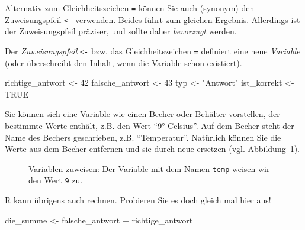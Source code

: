 \documentclass[
  letterpaper,
  twoside,
  open=any]{scrbook}
\newenvironment{Shaded}{\begin{snugshade}}{\end{snugshade}}
\newcommand{\ConstantTok}[1]{\textcolor[rgb]{0.56,0.35,0.01}{#1}}
\newcommand{\DecValTok}[1]{\textcolor[rgb]{0.68,0.00,0.00}{#1}}
\newcommand{\NormalTok}[1]{\textcolor[rgb]{0.00,0.23,0.31}{#1}}
\newcommand{\OtherTok}[1]{\textcolor[rgb]{0.00,0.23,0.31}{#1}}
\newcommand{\SpecialCharTok}[1]{\textcolor[rgb]{0.37,0.37,0.37}{#1}}
\newcommand{\StringTok}[1]{\textcolor[rgb]{0.13,0.47,0.30}{#1}}
\theoremstyle{definition}
\theoremstyle{definition}
\theoremstyle{definition}
\theoremstyle{remark}
\begin{document}
Alternativ zum Gleichheitszeichen \texttt{=} können Sie auch (synonym)
den Zuweisungspfeil \texttt{\textless{}-} verwenden. Beides führt zum
gleichen Ergebnis. Allerdings ist der Zuweisungspfeil präziser, und
sollte daher \emph{bevorzugt} werden.

Der \emph{Zuweisungspfeil} \texttt{\textless{}-} bzw. das
Gleichheitszeichen \texttt{=} definiert eine neue \emph{Variable} (oder
überschreibt den Inhalt, wenn die Variable schon existiert).

\begin{Shaded}
\begin{Highlighting}[]
\NormalTok{richtige\_antwort }\OtherTok{\textless{}{-}} \DecValTok{42}
\NormalTok{falsche\_antwort }\OtherTok{\textless{}{-}} \DecValTok{43}
\NormalTok{typ }\OtherTok{\textless{}{-}} \StringTok{"Antwort"}
\NormalTok{ist\_korrekt }\OtherTok{\textless{}{-}} \ConstantTok{TRUE}
\end{Highlighting}
\end{Shaded}

Sie können sich eine Variable wie einen Becher oder Behälter vorstellen,
der bestimmte Werte enthält, z.B. den Wert \enquote{9° Celsius}. Auf dem
Becher steht der Name des Bechers geschrieben, z.B.
\enquote{Temperatur}. Natürlich können Sie die Werte aus dem Becher
entfernen und sie durch neue ersetzen (vgl.
Abbildung~\ref{fig-def-vars}).

\begin{figure}


\caption{\label{fig-def-vars}Variablen zuweisen: Der Variable mit dem
Namen \texttt{temp} weisen wir den Wert \texttt{9} zu.}

\end{figure}%

R kann übrigens auch rechnen. Probieren Sie es doch gleich mal hier aus!

\begin{Shaded}
\begin{Highlighting}[]
\NormalTok{die\_summe }\OtherTok{\textless{}{-}}\NormalTok{ falsche\_antwort }\SpecialCharTok{+}\NormalTok{ richtige\_antwort}
\end{Highlighting}
\end{Shaded}
\end{document}
